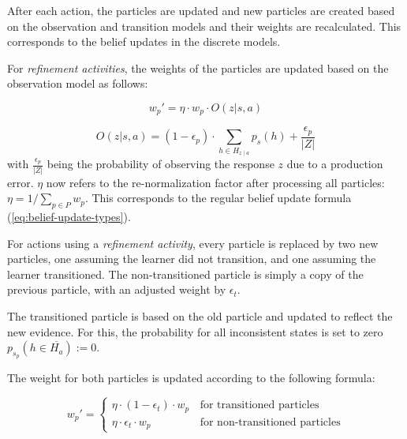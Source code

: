 After each action, the particles are updated and new particles are created based on the observation and transition models and their weights are recalculated.
This corresponds to the belief updates in the discrete models.


For \textit{refinement activities}, the weights of the particles are updated based on the observation model as follows:

\begin{equation}
    w_p' = \eta \cdot w_p \cdot O(z|s,a)
\end{equation}

\begin{equation}
    O(z|s,a) = (1 - \epsilon_p) \cdot \sum_{h \in H_{z\mid a}}{p_s(h)} + \frac{\epsilon_p}{|Z|}
\end{equation}
with $\frac{\epsilon_p}{|Z|}$ being the probability of observing the response $z$ due to a production error.
$\eta$ now refers to the re-normalization factor after processing all particles: $\eta = 1 / \sum_{p \in P}{w_p}$.
This corresponds to the regular belief update formula (\ref{eq:belief-update-types}).


For actions using a \textit{refinement activity}, every particle is replaced by two new particles, one assuming the learner did not transition, and one assuming the learner transitioned.
The non-transitioned particle is simply a copy of the previous particle, with an adjusted weight by $\epsilon_t$.

The transitioned particle is based on the old particle and updated to reflect the new evidence. For this, the probability for all inconsistent states is set to zero $p_{s_p}(h \in \overline{H_a}) := 0$.

The weight for both particles is updated according to the following formula:

\begin{equation}
    w_p' = \begin{cases} 
        \eta \cdot (1 - \epsilon_t) \cdot w_p & \, \text{for transitioned particles} \\
        \eta \cdot \epsilon_t \cdot w_p & \, \text{for non-transitioned particles}
    \end{cases}
\end{equation}

